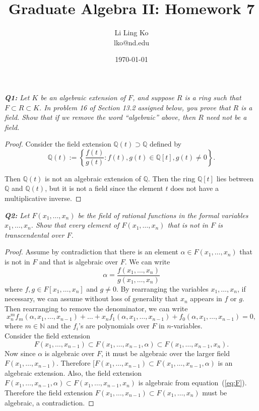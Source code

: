 \documentclass{article}
\begin{document}
\title{Graduate Algebra II: Homework 7}
\author{Li Ling Ko\\ lko@nd.edu}
\date{\today}
\maketitle

\it \textbf{Q1:} Let $K$ be an algebraic extension of $F$, and suppose $R$
  is a ring such that $F\subset R\subset K$. In problem 16 of Section 13.2
  assigned below, you prove that $R$ is a field. Show that if we remove the
  word ``algebraic'' above, then $R$ need not be a field.

  \begin{proof}
    Consider the field extension $\mathbb{Q}(t) \supset \mathbb{Q}$ defined
    by
    \[\mathbb{Q}(t):=\left\{\frac{f(t)}{g(t)}: f(t),g(t)\in\mathbb{Q}[t],
    g(t)\neq0\right\}.\]

    Then $\mathbb{Q}(t)$ is not an algebraic extension of $\mathbb{Q}$.
    Then the ring $\mathbb{Q}[t]$ lies between $\mathbb{Q}$ and
    $\mathbb{Q}(t)$, but it is not a field since the element $t$ does not
    have a multiplicative inverse.
  \end{proof}

\it \textbf{Q2:} Let $F(x_1,\ldots,x_n)$ be the field of rational functions
  in the formal variables $x_1,\ldots,x_n$. Show that every element of
  $F(x_1,\ldots,x_n)$ that is not in $F$ is transcendental over $F$.

  \begin{proof}
    Assume by contradiction that there is an element $\alpha\in
    F(x_1,\ldots,x_n)$ that is not in $F$ and that is algebraic over $F$.
    We can write
    \[\alpha =\frac{f(x_1,\ldots,x_n)} {g(x_1,\ldots,x_n)}\]
    where $f,g\in F[x_1,\ldots,x_n]$ and $g\neq0$.
    By rearranging the variables $x_1,\ldots,x_n$, if necessary, we can
    assume without loss of generality that $x_n$ appears in $f$ or $g$.
    Then rearranging to remove the denominator, we can write
    \begin{equation}
      x_n^mf_m(\alpha,x_1,\ldots,x_{n-1}) +\ldots
      +x_nf_1(\alpha,x_1,\ldots,x_{n-1}) +f_0(\alpha,x_1,\ldots,x_{n-1})
      =0,
      \label{eq:F}
    \end{equation}
    where $m\in\mathbb{N}$ and the $f_i$'s are polynomials over $F$ in
    $n$-variables.\\

    Consider the field extension
    \[F(x_1,\ldots,x_{n-1}) \subset F(x_1,\ldots,x_{n-1},\alpha) \subset
    F(x_1,\ldots,x_{n-1},x_n).\]
    Now since $\alpha$ is algebraic over $F$, it must be algebraic over the
    larger field $F(x_1,\ldots,x_{n-1})$. Therefore $[F(x_1,\ldots,x_{n-1})
    \subset F(x_1,\ldots,x_{n-1},\alpha)$ is an algebraic extension. Also,
    the field extension $F(x_1,\ldots,x_{n-1},\alpha) \subset
    F(x_1,\ldots,x_{n-1},x_n)$ is algebraic from equation~(\ref{eq:F}).
    Therefore the field extension $F(x_1,\ldots,x_{n-1}) \subset
    F(x_1,\ldots,x_{n})$ must be algebraic, a contradiction.
  \end{proof}
\end{document}
